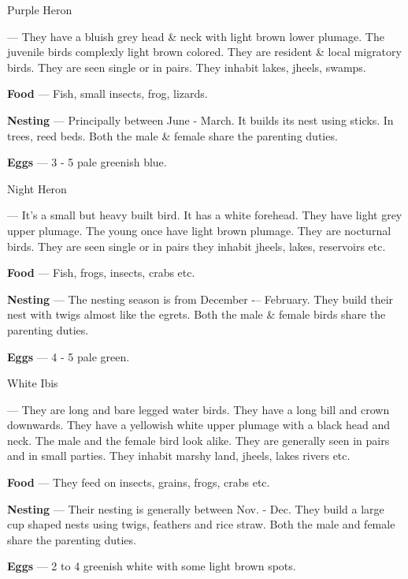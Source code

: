\begin{bird}{Purple Heron}

 --- They have a bluish grey head \& neck with light brown lower plumage. The juvenile birds complexly light brown colored. They are resident \& local migratory birds. They are seen single or in pairs. They inhabit lakes, jheels, swamps.

{\large\bf Food} --- Fish, small insects, frog, lizards.

{\large\bf Nesting} --- Principally between June - March. It builds its nest using sticks. In trees, reed beds. Both the male \& female share the parenting duties.

{\large\bf Eggs} --- 3 - 5 pale greenish blue.
\end{bird}

\begin{bird}{Night Heron}

 --- It's a small but heavy built bird. It has a white forehead. They have light grey upper plumage. The young once have light brown plumage. They are nocturnal birds. They are seen single or in pairs they inhabit jheels, lakes, reservoirs etc.

{\large\bf Food} --- Fish, frogs, insects, crabs etc.

{\large\bf Nesting} --- The nesting season is from December -– February. They build their nest with twigs almost like the egrets. Both the male \& female birds share the parenting duties.

{\bf Eggs} --- 4 - 5 pale green.
\end{bird}


\begin{bird}{White Ibis}

 --- They are long and bare legged water birds. They have a long bill and crown downwards. They have a yellowish white upper plumage with a black head and neck. The male and the female bird look alike. They are generally seen in pairs and in small parties. They inhabit marshy land, jheels, lakes rivers etc.

{\large\bf Food} --- They feed on insects, grains, frogs, crabs etc.

{\large\bf Nesting} --- Their nesting is generally between Nov. - Dec. They build a large cup shaped nests using twigs, feathers and rice straw. Both the male and female share the parenting duties. 

{\large\bf Eggs} --- 2 to 4 greenish white with some light brown spots.
\end{bird}

